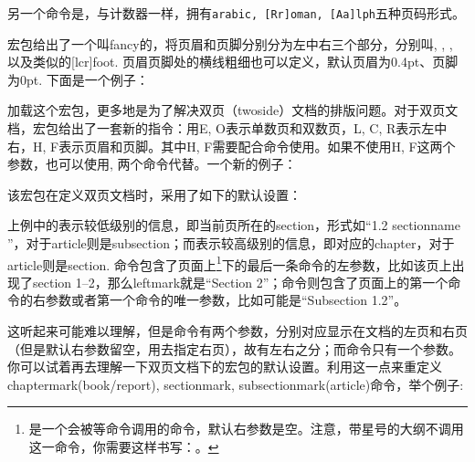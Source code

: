 另一个命令是，与计数器一样，拥有\texttt{arabic, [Rr]oman, [Aa]lph}五种页码形式。

宏包给出了一个叫fancy的，将页眉和页脚分别分为左中右三个部分，分别叫, , , 以及类似的[lcr]foot. 页眉页脚处的横线粗细也可以定义，默认页眉为0.4pt、页脚为0pt. 下面是一个例子：
\begin{latex}
\usepackage{fancyhdr}
\pagestyle{fancy}
    \lhead{}
    \chead{}
    \cfoot{\thepage}
\renewcommand{\headrulewidth}{0.4pt}
\renewcommand{\footrulewidth}{0.4pt}
\end{latex}

加载这个宏包，更多地是为了解决双页（twoside）文档的排版问题。对于双页文档，宏包给出了一套新的指令：用E, O表示单数页和双数页，L, C, R表示左中右，H, F表示页眉和页脚。其中H, F需要配合命令使用。如果不使用H, F这两个参数，也可以使用,  两个命令代替。一个新的例子：
\begin{latex}
\fancyhead{} %
\fancyfoot{} %
    \fancyfoot[C]{\thepage}
\end{latex}

该宏包在定义双页文档时，采用了如下的默认设置：
\begin{latex}
\fancyhead[LE,RO]{\slshape \rightmark}
\fancyhead[LO,RE]{\slshape \leftmark}
\fancyfoot[C]{\thepage}
\end{latex}

上例中的表示较低级别的信息，即当前页所在的section，形式如“1.2 sectionname ”，对于article则是subsection；而表示较高级别的信息，即对应的chapter，对于article则是section. 命令包含了页面上\footnote{是一个会被等命令调用的命令，默认右参数是空。注意，带星号的大纲不调用这一命令，你需要这样书写：。}下的最后一条命令的左参数，比如该页上出现了section 1--2，那么leftmark就是“Section 2”；命令则包含了页面上的第一个命令的右参数或者第一个命令的唯一参数，比如可能是“Subsection 1.2”。

这听起来可能难以理解，但是命令有两个参数，分别对应显示在文档的左页和右页（但是默认右参数留空，用去指定右页），故有左右之分；而命令只有一个参数。你可以试着再去理解一下双页文档下的宏包的默认设置。利用这一点来重定义chaptermark(book/report), sectionmark, subsectionmark(article)命令，举个例子:
\begin{latex}
\renewcommand{\sectionmark}[1]{\markright{\thesection.\ #1}}
\renewcommand{\chaptermark}[1]{\markboth{\MakeUppercase{%
    \chaptername}\ \thechapter.\ #1}{}}
\end{latex}

